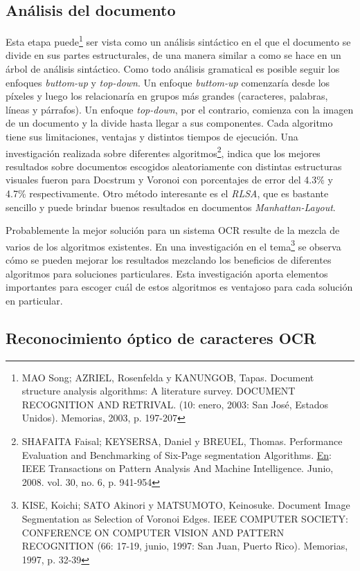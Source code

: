 \documentclass[a4paper, 11pt, oneside]{report}
\begin{document}
\subsection{Análisis del documento}

Esta etapa puede\footnote{MAO Song; AZRIEL, Rosenfelda y KANUNGOB, Tapas. Document structure analysis algorithms: A literature survey. DOCUMENT RECOGNITION AND RETRIVAL. (10: enero, 2003: San José, Estados Unidos).  Memorias, 2003, p. 197-207} ser vista como un análisis sintáctico en el que el documento se divide en sus partes estructurales, de una manera similar a como se hace en un árbol de análisis sintáctico. Como todo análisis gramatical es posible seguir los enfoques \textit{buttom-up} y \textit{top-down}. Un enfoque \textit{buttom-up} comenzaría desde los píxeles y luego los relacionaría en grupos más grandes (caracteres, palabras, líneas y párrafos). Un enfoque \textit{top-down}, por el contrario, comienza con la imagen de un documento y la divide hasta llegar a sus componentes. Cada algoritmo tiene sus limitaciones, ventajas y distintos tiempos de ejecución. Una investigación realizada sobre diferentes algoritmos\footnote{SHAFAITA Faisal; KEYSERSA,  Daniel y BREUEL, Thomas. Performance Evaluation and Benchmarking of Six-Page segmentation Algorithms. \underline{En}: IEEE Transactions on Pattern Analysis And Machine Intelligence.  Junio, 2008. vol. 30, no. 6, p. 941-954}, indica que los mejores resultados sobre documentos escogidos aleatoriamente con distintas estructuras visuales fueron para Docstrum y Voronoi con porcentajes de error del 4.3\% y 4.7\% respectivamente. Otro método interesante es el \textit{RLSA}, que es bastante sencillo y puede brindar buenos resultados en documentos \textit{Manhattan-Layout}. 

Probablemente la mejor solución para un sistema OCR resulte de la mezcla de varios de los algoritmos existentes. En una investigación en el tema\footnote{KISE, Koichi; SATO Akinori y MATSUMOTO,  Keinosuke. Document Image Segmentation as Selection of Voronoi Edges. IEEE COMPUTER SOCIETY: CONFERENCE ON COMPUTER VISION AND PATTERN RECOGNITION (66: 17-19, junio, 1997: San Juan,  Puerto Rico). Memorias, 1997, p. 32-39} se observa cómo se pueden mejorar los resultados mezclando los beneficios de diferentes algoritmos para soluciones particulares. Esta investigación aporta elementos importantes para escoger cuál de estos algoritmos es ventajoso para cada solución en particular.  

\subsection{Reconocimiento óptico de caracteres OCR}
\end{document}

